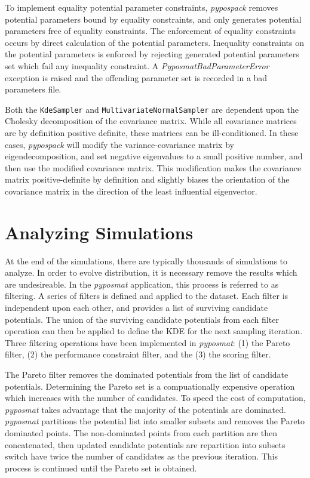 To implement equality potential parameter constraints, \emph{pypospack} removes potential parameters bound by equality constraints, and only generates potential parameters free of equality constraints.  The enforcement of equality constraints occurs by direct calculation of the potential parameters.  Inequality constraints on the potential parameters is enforced by rejecting generated potential parameters set which fail any inequality constraint.  A \emph{PyposmatBadParameterError} exception is raised and the offending parameter set is recorded in a bad parameters file.

Both the \verb|KdeSampler| and \verb|MultivariateNormalSampler| are dependent upon the Cholesky decomposition of the covariance matrix.  While all covariance matrices are by definition positive definite, these matrices can be ill-conditioned.
In these cases, \emph{pypospack} will modify the variance-covariance matrix by eigendecomposition, and set negative eigenvalues to a small positive number, and then use the modified covariance matrix.
This modification makes the covariance matrix positive-definite by definition and slightly biases the orientation of the covariance matrix in the direction of the least influential eigenvector.

\section{Analyzing Simulations}
\label{sec:pypospack_analyze}
At the end of the simulations, there are typically thousands of simulations to analyze.  In order to evolve distribution, it is necessary remove the results which are undesireable.  In the \emph{pyposmat} application, this process is referred to as filtering.  A series of filters is defined and applied to the dataset.  Each filter is independent upon each other, and provides a list of surviving candidate potentials.  The union of the surviving candidate potentials from each filter operation can then be applied to define the KDE for the next sampling iteration.  Three filtering operations have been implemented in \emph{pyposmat}: (1) the Pareto filter, (2) the performance constraint filter, and the (3) the scoring filter.

The Pareto filter removes the dominated potentials from the list of candidate potentials.  Determining the Pareto set is a compuationally expensive operation which increases with the number of candidates.  To speed the cost of computation, \emph{pyposmat} takes advantage that the majority of the potentials are dominated.  \emph{pyposmat} partitions the potential list into smaller subsets and removes the Pareto dominated points.  The non-dominated points from each partition are then concatenated, then updated candidate potentials are repartition into subsets switch have twice the number of candidates as the previous iteration.  This process is continued until the Pareto set is obtained.

